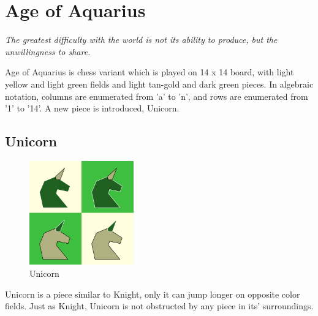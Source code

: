 \documentclass[a5paper,12pt,draft]{book} %
\begin{document}
\clearpage

\chapter*{Age of Aquarius}

\begin{flushright}
\parbox{0.8\textwidth}{
\emph{The greatest difficulty with the world is not its ability to produce, but the unwillingness to share. \\
 } }
\end{flushright}

\noindent
Age of Aquarius is chess variant which is played on 14 x 14 board,
with light yellow and light green fields and light tan-gold and
dark green pieces. In algebraic notation, columns are enumerated
from 'a' to 'n', and rows are enumerated from '1' to '14'. A new
piece is introduced, Unicorn.

\clearpage

\section*{Unicorn}

\noindent
\begin{figure}
\includegraphics[width=0.4\textwidth, keepaspectratio=true]{../gfx/pieces/09_unicorn.png}
\caption{Unicorn}
\label{fig:unicorn}
\end{figure}
Unicorn is a piece similar to Knight, only it can jump longer on
opposite color fields. Just as Knight, Unicorn is not obstructed
by any piece in its' surroundings.
\end{document}
